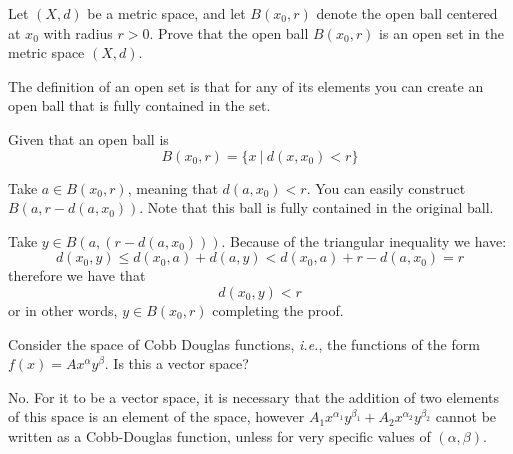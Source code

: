 \documentclass[a4paper,12pt,answers]{exam}
\begin{document}
{\begin{questions}
\question Let $(X,d)$ be a metric space, and let $B(x_0,r)$ denote the open ball centered at $x_0$ with radius $r>0$. Prove that the open ball $B(x_0,r)$ is an open set in the metric space $(X,d)$.

    \begin{solutionorgrid}[15cm]
        The definition of an open set is that for any of its elements you can create an open ball that is fully contained in the set.

        Given that an open ball is $$B(x_0,r)=\{x\ |\ d(x,x_0)<r\}$$

        Take $a\in B(x_0,r)$, meaning that $d(a,x_0)<r$. You can easily construct $B(a,r-d(a,x_0))$. Note that this ball is fully contained in the original ball.

        Take $y\in B(a,(r-d(a,x_0)))$. Because of the triangular inequality we have:
        $$d(x_0,y)\leq d(x_0,a)+d(a,y)<d(x_0,a)+r-d(a,x_0)=r$$ therefore we have that $$d(x_0,y)<r$$ or in other words, $y\in B(x_0,r)$ completing the proof.
    \end{solutionorgrid}

\question Consider the space of Cobb Douglas functions, \textit{i.e.}, the functions of the form $f(x)=Ax^\alpha y^\beta$. Is this a vector space?

    \begin{solutionorgrid}[20cm]
        No. For it to be a vector space, it is necessary that the addition of two elements of this space is an element of the space, however $A_1 x^{\alpha_1}y^{\beta_1}+A_2 x^{\alpha_2}y^{\beta_2}$ cannot be written as a Cobb-Douglas function, unless for very specific values of $(\alpha,\beta)$.
    \end{solutionorgrid}

\end{questions}
}

\clearpage


\clearpage

\end{document}
